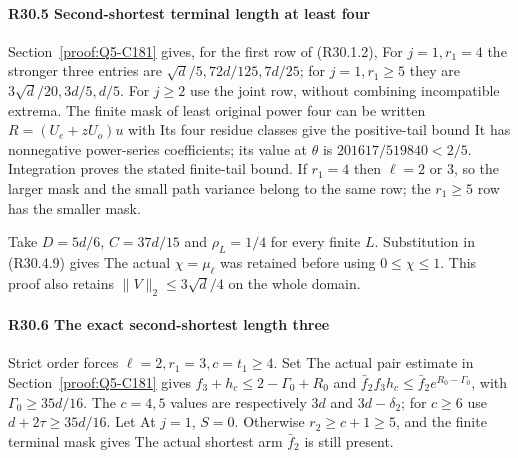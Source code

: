 \paragraph{R30.5 Second-shortest terminal length at least four}\label{part:R30.5}
Section~\ref{proof:Q5-C181} gives, for the first row of (R30.1.2),
For $j=1,r_1=4$ the stronger three entries are
$\sqrt d/5,72d/125,7d/25$; for $j=1,r_1\ge5$ they are
$3\sqrt d/20,3d/5,d/5$. For $j\ge2$ use the joint row, without
combining incompatible extrema. The finite mask of least original
power four can be written $R=(U_e+zU_o)u$ with
Its four residue classes give the positive-tail bound
It has nonnegative power-series coefficients; its value at $\theta$
is $201617/519840<2/5$. Integration proves the stated finite-tail
bound. If $r_1=4$ then $\ell=2$ or $3$, so the larger mask and the
small path variance belong to the same row; the $r_1\ge5$ row has
the smaller mask.

Take $D=5d/6$, $C=37d/15$ and $\rho_L=1/4$ for every finite $L$.
Substitution in (R30.4.9) gives
The actual $\chi=\mu_\ell$ was retained before using $0\le\chi\le1$.
This proof also retains $\|V\|_2\le3\sqrt d/4$ on the whole domain.

\paragraph{R30.6 The exact second-shortest length three}
Strict order forces $\ell=2,r_1=3,c=t_1\ge4$. Set
The actual pair estimate in Section~\ref{proof:Q5-C181} gives
$f_3+h_c\le2-\Gamma_0+R_0$ and
$\bar f_2f_3h_c\le\bar f_2e^{R_0-\Gamma_0}$, with
$\Gamma_0\ge35d/16$. The $c=4,5$ values are respectively $3d$ and
$3d-\delta_2$; for $c\ge6$ use $d+2\tau\ge35d/16$.
Let
At $j=1$, $S=0$. Otherwise $r_2\ge c+1\ge5$, and the finite
terminal mask gives
The actual shortest arm $\bar f_2$ is still present.

